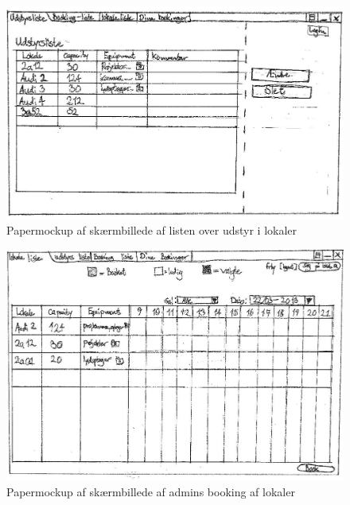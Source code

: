 \begin{figure}[h!]
  \centering
    \includegraphics[angle=90, height=0.9\textheight]{Appendix/GUI-Prototype/PaperMockup/LokaleUdstyrListe_001}
  \caption{Papermockup af skærmbillede af listen over udstyr i lokaler}
\label{App_GUI_paper_LokaleUdstyrListe}
\end{figure}

\begin{figure}[h!]
  \centering
    \includegraphics[angle=90, height=0.9\textheight]{Appendix/GUI-Prototype/PaperMockup/LokaleListeSuper_001}
  \caption{Papermockup af skærmbillede af admins booking af lokaler}
\label{App_GUI_paper_LokaleListeSuper}
\end{figure}

